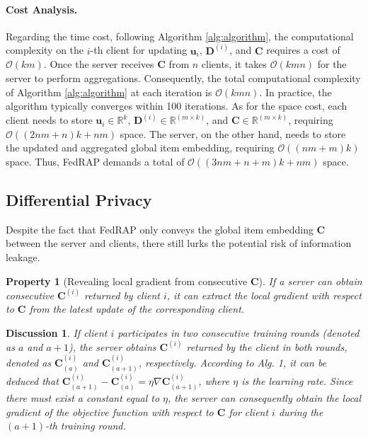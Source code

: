 \documentclass{article} %
\newtheorem{property}{Property}
\newtheorem{discussion}{Discussion}
\begin{document}
\paragraph{Cost Analysis.}
Regarding the time cost, following Algorithm \ref{alg:algorithm}, the computational complexity on the $i$-th client for updating $\mathbf{u}_i$, $\mathbf{D}^{(i)}$, and $\mathbf{C}$ requires a cost of $\mathcal{O}(km)$. 
Once the server receives $\mathbf{C}$ from $n$ clients, it takes $\mathcal{O}(kmn)$ for the server to perform aggregations. Consequently, the total computational complexity of Algorithm \ref{alg:algorithm} at each iteration is $\mathcal{O}(kmn)$. In practice, the algorithm typically converges within 100 iterations.
As for the space cost, each client needs to store $\mathbf{u}_i \in \mathbb{R}^k$, $\mathbf{D}^{(i)} \in \mathbb{R}^{(m \times k)}$, and $\mathbf{C} \in \mathbb{R}^{(m \times k)}$, requiring $\mathcal{O}((2nm+n)k+nm)$ space. The server, on the other hand, needs to store the updated and aggregated global item embedding, requiring $\mathcal{O}((nm+m)k)$ space. Thus, FedRAP demands a total of $\mathcal{O}((3nm+n+m)k+nm)$ space.

\subsection{Differential Privacy}
Despite the fact that FedRAP only conveys the global item embedding $\mathbf{C}$ between the server and clients, there still lurks the potential risk of information leakage.
\begin{property}[Revealing local gradient from consecutive $\mathbf{C}$]
\label{property:reveal_grad}
If a server can obtain consecutive $\mathbf{C}^{(i)}$ returned by client $i$, it can extract the local gradient with respect to $\mathbf{C}$ from the latest update of the corresponding client.
\end{property}

\begin{discussion}
If client $i$ participates in two consecutive training rounds (denoted as $a$ and $a+1$), the server obtains $\mathbf{C}^{(i)}$ returned by the client in both rounds, denoted as $\mathbf{C}^{(i)}_{(a)}$ and $\mathbf{C}^{(i)}_{(a+1)}$, respectively. According to Alg. 1, it can be deduced that $\mathbf{C}^{(i)}_{(a+1)} - \mathbf{C}^{(i)}_{(a)} = \eta \nabla \mathbf{C}^{(i)}_{(a+1)}$, where $\eta$ is the learning rate. Since there must exist a constant equal to $\eta$, the server can consequently obtain the local gradient of the objective function with respect to $\mathbf{C}$ for client $i$ during the $(a+1)$-th training round.
\end{discussion}
\end{document}
